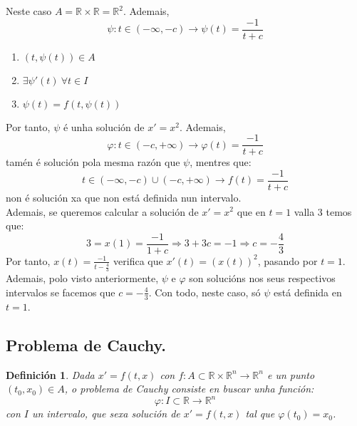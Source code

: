 \documentclass[11pt, a4paper,twoside]{article}
\makeatletter
\theoremstyle{theorem-style}  %
\renewenvironment{proof}[1][\proofname]{\par
	\pushQED{\qed}%
	\normalfont \topsep6\p@\@plus6\p@\relax
	\list{}{%
		\settowidth{\leftmargin}{\quad:\hskip\labelsep}%
		\setlength{\labelwidth}{0pt}%
		\setlength{\itemindent}{-\leftmargin}%
	}%
	\item[\hskip\labelsep\itshape#1\@addpunct{:}]\ignorespaces
}{%
	\popQED\endlist\@endpefalse
}
\theoremstyle{definition-style}
\newtheorem{definition}{Definición}[section]
\theoremstyle{example-style}
\makeatother
\begin{document}
\begin{proof}[Solución]
	

	
	
	Neste caso $A = \mathbb{R} \times \mathbb{R} = \mathbb{R}^2$. Ademais,
	\[\psi:t \in (- \infty, - c) \longrightarrow \psi(t) = \frac{-1}{t+c}\]
	\begin{enumerate}
		\item $(t, \psi(t)) \in A$
		\item $\exists \psi' (t) \ \forall t \in I$
		\item $\psi (t) = f(t, \psi (t))$
	\end{enumerate}
	Por tanto, $\psi$ é unha solución de $x'=x^2$. Ademais,
	\[\varphi:t \in (-c, +\infty ) \longrightarrow \varphi(t) = \frac{-1}{t+c}\]
	tamén é solución pola mesma razón que $\psi$, mentres que:
	\[t \in (- \infty, - c) \cup (-c, +\infty ) \longrightarrow f(t) = \frac{-1}{t+c}\]
	non é solución xa que non está definida nun intervalo. \\
	Ademais, se queremos calcular a solución de $x'=x^2$ que en $t =1$ valla $3$ temos que:
	\[3 = x(1) = \frac{-1}{1+c} \Rightarrow 3 + 3c = -1 \Rightarrow c = -\frac{4}{3}\]
	Por tanto, $x(t) = \frac{-1}{t-\frac{4}{3}}$ verifica que $x'(t) = (x(t))^2$, pasando por $ t=1 $. Ademais, polo visto anteriormente, $\psi$ e $\varphi$ son solucións nos seus respectivos intervalos se facemos que $c = - \frac{4}{3}$. Con todo, neste caso, só $ \psi $ está definida en $ t=1 $.
\end{proof}
\subsection{Problema de Cauchy.}

\begin{definition}
	Dada $x' = f(t, x)$ con $f: A \subset \mathbb{R} \times \mathbb{R}^n \longrightarrow \mathbb{R}^n$ e un punto $(t_0, x_0) \in A$, o problema de Cauchy consiste en buscar unha función:
	\[\varphi : I \subset \mathbb{R} \longrightarrow \mathbb{R}^n\]
	con $I$ un intervalo, que sexa solución de $x' = f(t, x)$ tal que $\varphi (t_0) = x_0$.
\end{definition}
\end{document}
